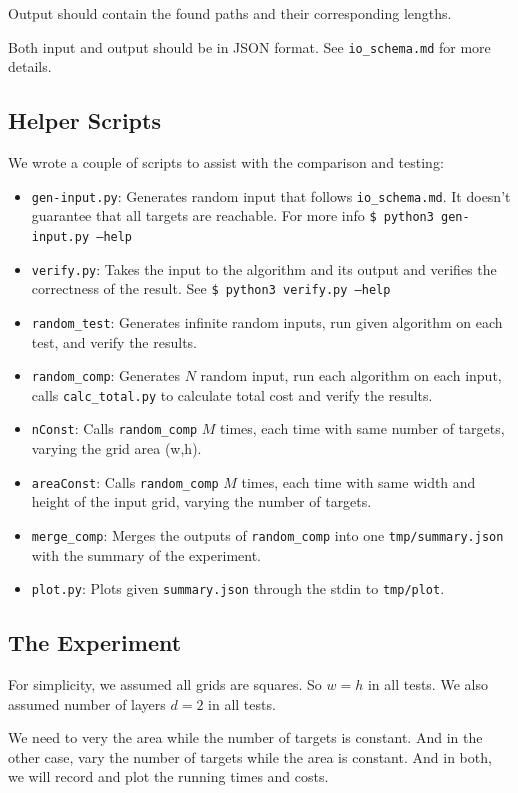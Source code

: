 Output should contain the found paths and their corresponding lengths.

Both input and output should be in JSON format. See \texttt{io\_schema.md} for more details.

\subsection{Helper Scripts}
We wrote a couple of scripts to assist with the comparison and testing:
\begin{itemize}
    \item \texttt{gen-input.py}: Generates random input that follows \texttt{io\_schema.md}. It doesn't guarantee that all targets are reachable. For more info \texttt{\$ python3 gen-input.py --help}
    \item \texttt{verify.py}: Takes the input to the algorithm and its output and verifies the correctness of the result. See \texttt{\$ python3 verify.py --help}
    \item \texttt{random\_test}: Generates infinite random inputs, run given algorithm on each test, and verify the results.
    \item \texttt{random\_comp}: Generates $N$ random input, run each algorithm on each input, calls \texttt{calc\_total.py} to calculate total cost and verify the results.
    \item \texttt{nConst}: Calls \texttt{random\_comp} $M$ times, each time with same number of targets, varying the grid area (w,h).
    \item \texttt{areaConst}: Calls \texttt{random\_comp} $M$ times, each time with same width and height of the input grid, varying the number of targets.
    \item \texttt{merge\_comp}: Merges the outputs of \texttt{random\_comp} into one \texttt{tmp/summary.json} with the summary of the experiment.
    \item \texttt{plot.py}: Plots given \texttt{summary.json} through the stdin to \texttt{tmp/plot}.
\end{itemize}

\subsection{The Experiment}
For simplicity, we assumed all grids are squares. So $w=h$ in all tests.
We also assumed number of layers $d=2$ in all tests.

We need to very the area while the number of targets is constant. And in the other case, vary the number of targets while the area is constant.
And in both, we will record and plot the running times and costs.

